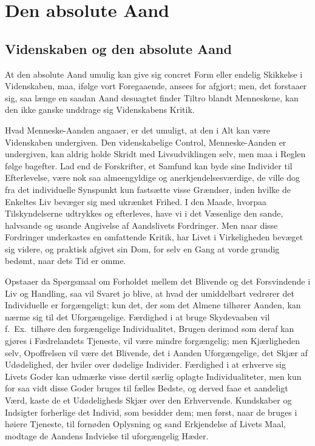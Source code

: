 \documentclass[12pt]{book}
\newcommand{\apage}[1]{\marginnote{\footnotesize\textit{[#1]}}}
\begin{document}
\chapter{Den absolute Aand}

\section{Videnskaben og den absolute Aand}
\label{sec:25}

\noindent \apage{270} At den absolute Aand umulig kan give sig concret Form eller endelig
Skikkelse i Videnskaben, maa, ifølge vort Foregaaende, ansees for afgjort;
men, det forstaaer sig, saa længe en saadan Aand desuagtet finder Tiltro
blandt Menneskene, kan den ikke ganske unddrage sig Videnskabens Kritik.

Hvad Menneske-Aanden angaaer, er det umuligt, at den i Alt kan være
Videnskaben undergiven. Den videnskabelige Control, Menneske-Aanden er
undergiven, kan aldrig holde Skridt med Livsudviklingen selv, men maa i Reglen
følge bagefter. Lad end de Forskrifter, et Samfund kan byde sine Individer til
Efterlevelse, være nok saa almeengyldige og anerkjendelsesværdige, de ville
dog fra det individuelle Synspunkt kun fastsætte visse Grændser, inden hvilke
de Enkeltes Liv bevæger sig med ukrænket Frihed. I den Maade, hvorpaa
Tilskyndelserne udtrykkes og efterleves, have vi i det Væsenlige den sande,
halvsande og usande Angivelse af Aandslivets Fordringer. Men naar disse
Fordringer underkastes en omfattende Kritik, har Livet i Virkeligheden bevæget
sig videre, og praktisk afgivet sin Dom, for selv en Gang at vorde grundig
bedømt, naar dets Tid er omme.

\apage{271} Opstaaer da Spørgsmaal om Forholdet mellem det Blivende og det Forsvindende i
Liv og Handling, saa vil Svaret jo blive, at hvad der umiddelbart vedrører det
Individuelle er forgængeligt; kun det, der som det Almene tilhører Aanden, kan
nærme sig til det Uforgængelige. Færdighed i at bruge Skydevaaben vil f.\ Ex.\
tilhøre den forgængelige Individualitet, Brugen derimod som deraf kan gjøres i
Fædrelandets Tjeneste, vil være mindre forgængelig; men Kjærligheden selv,
Opoffrelsen vil være det Blivende, det i Aanden Uforgængelige, det Skjær af
Udødelighed, der hviler over dødelige Individer. Færdighed i at erhverve sig
Livets Goder kan udmærke visse dertil særlig oplagte Individualiteter, men kun
for saa vidt disse Goder bruges til fælles Bedste, og derved faae et aandeligt
Værd, kaste de et Udødeligheds Skjær over den Erhvervende. Kundskaber og
Indsigter forherlige det Individ, som besidder dem; men først, naar de bruges
i høiere Tjeneste, til fornøden Oplysning og sand Erkjendelse af Livets Maal,
modtage de Aandens Indvielse til uforgængelig Hæder.
\end{document}
